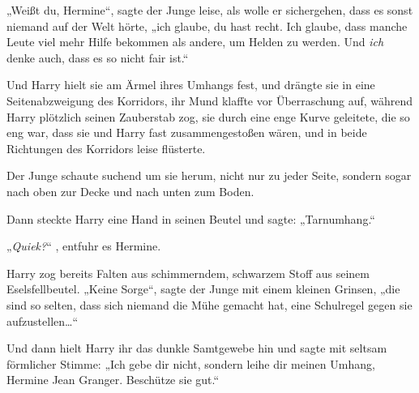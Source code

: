 „Weißt du, Hermine“, sagte der Junge leise, als wolle er sichergehen, dass es sonst niemand auf der Welt hörte, „ich glaube, du hast recht. Ich glaube, dass manche Leute viel mehr Hilfe bekommen als andere, um Helden zu werden. Und \emph{ich} denke auch, dass es so nicht fair ist.“

Und Harry hielt sie am Ärmel ihres Umhangs fest, und drängte sie in eine Seitenabzweigung des Korridors, ihr Mund klaffte vor Überraschung auf, während Harry plötzlich seinen Zauberstab zog, sie durch eine enge Kurve geleitete, die so eng war, dass sie und Harry fast zusammengestoßen wären, und in beide Richtungen des Korridors leise  flüsterte.

Der Junge schaute suchend um sie herum, nicht nur zu jeder Seite, sondern sogar nach oben zur Decke und nach unten zum Boden.

Dann steckte Harry eine Hand in seinen Beutel und sagte: „Tarnumhang.“

„\emph{Quiek?}“ , entfuhr es Hermine.

Harry zog bereits Falten aus schimmerndem, schwarzem Stoff aus seinem Eselsfellbeutel. „Keine Sorge“, sagte der Junge mit einem kleinen Grinsen, „die sind so selten, dass sich niemand die Mühe gemacht hat, eine Schulregel gegen sie aufzustellen…“

Und dann hielt Harry ihr das dunkle Samtgewebe hin und sagte mit seltsam förmlicher Stimme: „Ich gebe dir nicht, sondern leihe dir meinen Umhang, Hermine Jean Granger. Beschütze sie gut.“

